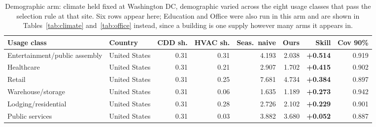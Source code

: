 \begin{table}[t]
\centering
\scriptsize
\setlength{\tabcolsep}{3pt}
\begin{tabular}{llrrrrrr}
\toprule
Usage class & Country & CDD sh. & HVAC sh. & Seas.\ naive & Ours & Skill & Cov 90\% \\
\midrule
Entertainment/public assembly & United States & 0.31 & 0.31 & 4.193 & 2.038 & \textbf{+0.514} & 0.919 \\
Healthcare & United States & 0.31 & 0.21 & 2.907 & 1.702 & \textbf{+0.415} & 0.902 \\
Retail & United States & 0.31 & 0.25 & 7.681 & 4.734 & \textbf{+0.384} & 0.897 \\
Warehouse/storage & United States & 0.31 & 0.06 & 1.635 & 1.189 & \textbf{+0.273} & 0.942 \\
Lodging/residential & United States & 0.31 & 0.28 & 2.726 & 2.102 & \textbf{+0.229} & 0.901 \\
Public services & United States & 0.31 & 0.03 & 3.882 & 3.680 & \textbf{+0.052} & 0.887 \\
\bottomrule
\end{tabular}
\caption{Demographic arm: climate held fixed at Washington DC, demographic varied across the eight usage classes that pass the selection rule at that site. Six rows appear here; Education and Office were also run in this arm and are shown in Tables~\ref{tab:climate} and~\ref{tab:office} instead, since a building is one supply however many arms it appears in.}
\label{tab:demographic}
\end{table}
